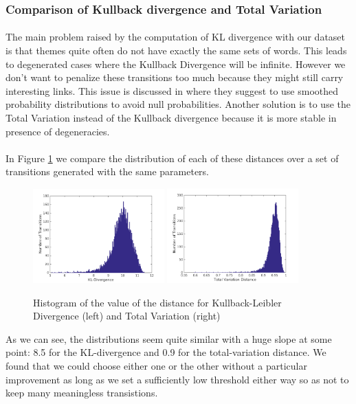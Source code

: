 \subsubsection{Comparison of Kullback divergence and Total Variation}

\paragraph{}
The main problem raised by the computation of KL divergence with our dataset is that themes quite often do not have exactly the same sets of words. This leads to degenerated cases where the Kullback Divergence will be infinite. However we don't want to penalize these transitions too much because they might still carry interesting links. This issue is discussed in \cite{de2010grammatical} where they suggest to use smoothed probability distributions to avoid null probabilities. Another solution is to use the Total Variation instead of the Kullback divergence because it is more stable in presence of degeneracies.

\paragraph{}
In Figure \ref{fig:distancecomparison} we compare the distribution of each of these distances over a set of transitions generated with the same parameters.
\begin{figure}[H]
\begin{center}
	\label{fig:distancecomparison}
	\includegraphics[width=0.45\textwidth]{images/divergence}
	\includegraphics[width=0.45\textwidth]{images/totalvariation}
	\caption{Histogram of the value of the distance for Kullback-Leibler Divergence (left) and Total Variation (right)}
\end{center}
\end{figure}
As we can see, the distributions seem quite similar with a huge slope at some point: 8.5 for the KL-divergence and 0.9 for the total-variation distance. We found that we could choose either one or the other without a particular improvement as long as we set a sufficiently low threshold either way so as not to keep many meaningless transistions.

